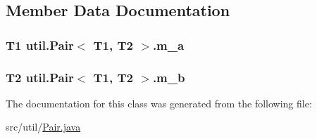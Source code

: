 \subsection{Member Data Documentation}
\hypertarget{classutil_1_1_pair_3_01_t1_00_01_t2_01_4_a016d830c5a1e1314dfd4940173318320}{
\subsubsection[{m\_\-a}]{\setlength{\rightskip}{0pt plus 5cm}T1 util.Pair$<$ T1, T2 $>$.{\bf m\_\-a}}}
\label{classutil_1_1_pair_3_01_t1_00_01_t2_01_4_a016d830c5a1e1314dfd4940173318320}
\hypertarget{classutil_1_1_pair_3_01_t1_00_01_t2_01_4_ae1acf917c4507eec2d708f3186427629}{
\subsubsection[{m\_\-b}]{\setlength{\rightskip}{0pt plus 5cm}T2 util.Pair$<$ T1, T2 $>$.{\bf m\_\-b}}}
\label{classutil_1_1_pair_3_01_t1_00_01_t2_01_4_ae1acf917c4507eec2d708f3186427629}


The documentation for this class was generated from the following file:\begin{DoxyCompactItemize}
\item 
src/util/\hyperlink{_pair_8java}{Pair.java}\end{DoxyCompactItemize}
